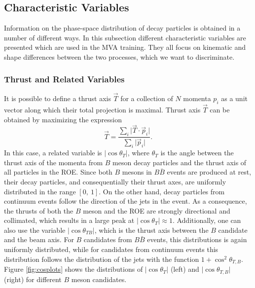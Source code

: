 \subsection{Characteristic Variables}
\label{ss:charvar}
Information on the phase-space distribution of decay particles is obtained in a number of different ways. In this subsection different characteristic variables are presented which are used in the MVA training. They all focus on kinematic and shape differences between the two processes, which we want to discriminate. 


\subsubsection{Thrust and Related Variables}
It is possible to define a thrust axis $\vec{T}$ for a collection of $N$ momenta $p_i$ as a unit vector along which their total projection is maximal. Thrust axis $\vec T$ can be obtained by maximizing the expression
\begin{equation}
\vec{T} = \frac{\sum_{i}\vert \vec{T} \cdot \vec{p}_i\vert}{\sum_{i}\vert \vec{p}_i\vert}.
\end{equation}
In this case, a related variable is $\vert \cos\theta_T\vert$, where $\theta_T$ is the angle between the thrust axis of the momenta from $B$ meson decay particles and the thrust axis of all particles in the ROE. Since both $B$ mesons in $B \bar B$ events are produced at rest, their decay particles, and consequentially their thrust axes, are uniformly distributed in the range $[0,~1]$. On the other hand, decay particles from continuum events follow the direction of the jets in the event. As a consequence, the thrusts of both the $B$ meson and the ROE are strongly directional and collimated, which results in a large peak at $\vert \cos\theta_T\vert \approx 1$. Additionally, one can also use the variable $\vert \cos\theta_{TB}\vert $, which is the thrust axis between the $B$ candidate and the beam axis. For $B$ candidates from $B \bar B$ events, this distributions is again uniformly distributed, while for candidates from continuum events this distribution follows the distribution of the jets with the function $1+\cos^2\theta_{T,B}$. Figure \ref{fig:cosplots} shows the distributions of $\vert \cos\theta_T\vert$ (left) and $\vert \cos\theta_{T,B}\vert$ (right) for different $B$ meson candidates.

